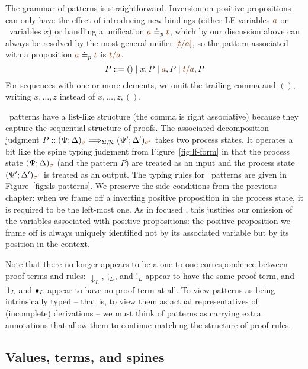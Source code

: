 The grammar of patterns is straightforward.
% 
Inversion on positive propositions
can only have the effect of introducing new bindings (either LF
variables $\lf{a}$ or \sls~variables $x$) or handling a unification
$\lf{a} \doteq_p \lf{t}$, which by our discussion above can always be
resolved by the most general unifier $\lf{[t/a]}$, so the pattern associated
with a proposition $\lf{a} \doteq_p \lf{t}$ is $\lf{t/a}$. 
\[
P ::= () \mid x, P \mid \lf{a}, P \mid \lf{t/a}, P
\] 
For sequences with one or more elements, we omit the trailing
comma and $()$, writing $x, \ldots, z$ 
instead of $x, \ldots, z, ()$. 

\sls~patterns have a list-like structure (the comma is right associative)
because they capture the sequential structure of proofs. The associated
decomposition judgment  $P :: (\Psi;
\Delta)_{\lf{\sigma}} \Longrightarrow_{\Sigma,\subord} (\Psi';
\Delta')_{\lf{\sigma'}}$
takes two process states. It operates a bit like the spine typing
judgment from Figure~\ref{fig:lf-form} in that the process state
$(\Psi; \Delta)_{\lf{\sigma}}$ (and the pattern $P$) are treated as an
input and the process state $(\Psi'; \Delta')_{\lf{\sigma'}}$ is
treated as an output.  The typing rules for \sls~patterns are given in
Figure~\ref{fig:sls-patterns}. We preserve the side conditions from
the previous chapter: when we frame off a inverting positive
proposition in the process state, it is required to be the left-most
one. As in focused \ollll, this justifies our omission of the
variables associated with positive propositions: the positive
proposition we frame off is always uniquely identified not by its
associated variable but by its position in the context.

Note that there no longer appears to be a one-to-one
correspondence between proof terms and rules: ${\downarrow}_L$,
${\gnab}_L$, and ${!}_L$ appear to have the same proof term, and
${\mathbf{1}}_L$ and ${\mathbin{\bullet}}_L$ appear to have no proof term at all. To
view patterns as being intrinsically typed -- that is, to view them as
actual representatives of (incomplete) derivations -- we must think of
patterns as carrying extra annotations that allow them to continue
matching the structure of proof rules.



\subsection{Values, terms, and spines}
\label{sec:framework-deductive}

